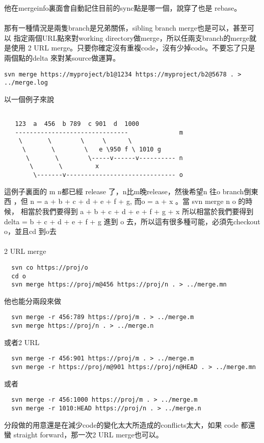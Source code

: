   他在mergeinfo裏面會自動記住目前的sync點是哪一個，說穿了也是 rebase。
  \\\\
  那有一種情況是兩隻branch是兄弟關係，sibling branch merge也是可以，甚至可以
  指定兩個URL點來對working directory做merge，所以任兩支branch的merge就是使用
  2 URL merge。只要你確定沒有重複code，沒有少掉code。不要忘了只是兩個點的delta
  來對某source做運算。
  \begin{verbatim}
svn merge https://myproject/b1@1234 https://myproject/b2@5678 . > ../merge.log
  \end{verbatim}
  以一個例子來說
  \begin{verbatim}

   123  a  456  b 789  c 901  d  1000
   -------------------------------              m
    \       \        \     \      \
     \       \        \   e \950 f \ 1010 g
      \       \        \-----v------v---------- n
       \       \         x
        \-------v------------------------------ o

  \end{verbatim}
  這例子裏面的 m n都已經 release 了，n比m晚release，然後希望n 往o branch倒東西
  ，但 n = a + b + c + d + e + f + g, 而o = a + x 。當 svn merge n o 的時候，
  相當於我們要得到 a + b + c + d + e + f + g + x 所以相當於我們要得到
  delta = b + c + d + e + f + g 進到 o 去，所以這有很多種可能，必須先checkout
  o，並且cd 到o去
  \\\\
  2 URL merge
  \begin{verbatim}
  svn co https://proj/o
  cd o
  svn merge https://proj/m@456 https://proj/n . > ../merge.mn
  \end{verbatim}
  他也能分兩段來做
  \begin{verbatim}
  svn merge -r 456:789 https://proj/m . > ../merge.m
  svn merge https://proj/n . > ../merge.n
  \end{verbatim}
  或者2 URL
  \begin{verbatim}
  svn merge -r 456:901 https://proj/m . > ../merge.m
  svn merge -r https://proj/m@901 https://proj/n@HEAD . > ../merge.mn
  \end{verbatim}
  或者
  \begin{verbatim}
  svn merge -r 456:1000 https://proj/m . > ../merge.m
  svn merge -r 1010:HEAD https://proj/n . > ../merge.n
  \end{verbatim}
  分段做的用意還是在減少code的變化太大所造成的conflicts太大，如果 code 都還蠻
  straight forward，那一次2 URL merge也可以。
  \\\\
